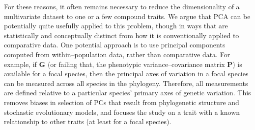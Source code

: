 \documentclass[a4paper,12pt]{article}
\begin{document}


For these reasons, it often remains necessary to reduce the dimensionality of a multivariate dataset to one or a few compound traits. We argue that PCA can be potentially quite usefully applied to this problem, though in ways that are statistically and conceptually distinct from how it is conventionally applied to comparative data. One potential approach is to use principal components computed from within--population data, rather than comparative data. For example, if $\mathbf{G}$ (or failing that, the phenotypic variance--covariance matrix $\mathbf{P}$) is available for a focal species, then the principal axes of variation in a focal species can be measured across all species in the phylogeny. Therefore, all measurements are defined relative to a particular species' primary axes of genetic variation. This removes biases in selection of PCs that result from phylogenetic structure and stochastic evolutionary models, and focuses the study on a trait with a known relationship to other traits (at least for a focal species). 
\end{document}
